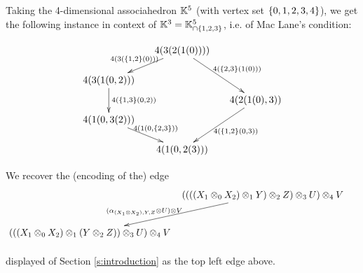 Taking the 4-dimensional associahedron ${\mathbb K}^5$ (with vertex set $\left\{0,1,2,3,4\right\}$), we get the following instance in context of ${\mathbb K}^3={\mathbb K}^5_{\cap \left\{1,2,3\right\}}$, i.e. of Mac Lane's condition:
\begin{center}
$$\xymatrix @-1.65pc {&& 4(3(2(1(0)))) \ar @{->}[ddll]_{4(3(\set{1,2}(0)))} \ar @{->}[dddrr]^{4(\set{2,3}(1(0)))}&& \\
 &&&&\\
4(3(1(0,2)))  \ar @{->}[dd]^{4(\set{1,3}(0,2))}&&   && \\
 &&&&4(2(1(0),3)) \ar @{->}[dddll]^{4(\set{1,2}(0,3))}\\
 4(1(0,3(2))) \ar @{->}[ddrr]^{4(1(0,\set{2,3}))} &  &\\
 &&&&\\
 &&4(1(0,2(3)))&&}$$
\end{center}
We recover the (encoding of the) edge 
 $$
 \xymatrix @-2pc {&& ((((X_1\otimes_0 X_2)\otimes_1 Y)\otimes_2 Z)\otimes_3 U)\otimes_4 V \ar @{->}[dddddll]_(.6){(\alpha_{(X_1\otimes X_2),Y,Z}\otimes U)\otimes V\quad} && \\
 &&&&\\
 &&&&\\
  &&&&\\
    &&&&\\
( ((X_1\otimes_0 X_2)\otimes_1 (Y\otimes_2 Z))\otimes_3 U)\otimes_4 V  &&   && \\
\ }
$$
displayed of Section \ref{s:introduction} as the top left edge above.




